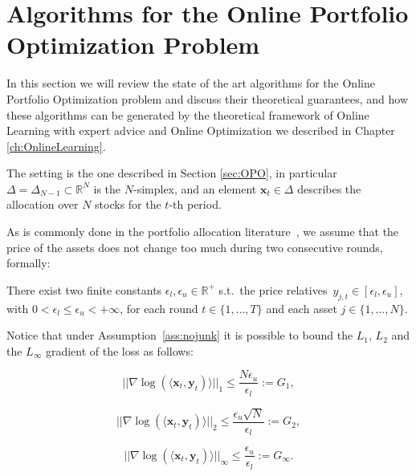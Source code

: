 \chapter{Algorithms for the Online Portfolio Optimization Problem}\label{ch:algos}

In this section we will review the state of the art algorithms for the Online Portfolio Optimization problem and discuss their theoretical guarantees, and how these algorithms can be generated by the theoretical framework of Online Learning with expert advice and Online Optimization we described in Chapter \ref{ch:OnlineLearning}.

The setting is the one described in Section \ref{sec:OPO}, in particular $\Delta=\Delta_{N-1}\subset \mathbb R^N$ is the $N$-simplex, and an element $\mathbf x_t\in\Delta$ describes the allocation over $N$ stocks for the $t$-th period.

As is commonly done in the portfolio allocation literature~\cite{agarwal2006algorithms}, we assume that the price of the assets does not change too much during two consecutive rounds, formally:

\begin{assumption} \label{ass:nojunk}
     There exist two finite constants $\epsilon_l, \epsilon_u \in \mathbb{R}^+$ s.t.~the price relatives~$y_{j,t} \in [\epsilon_l, \epsilon_u]$, with $0 < \epsilon_l \leq \epsilon_u < +\infty$, for each round $t \in \{ 1, \ldots, T \}$ and each asset $j \in \{1, \ldots, N \}$.
\end{assumption}

Notice that under Assumption~\ref{ass:nojunk} it is possible to bound the $L_1$, $L_2$ and the $L_\infty$ gradient of the loss as follows:

\begin{equation} \label{eq:bounded_gradient_1}
    ||\nabla \log (\langle \mathbf{x}_t, \mathbf{y}_t) \rangle||_1 \leq \frac{N\epsilon_u}{\epsilon_l}:=G_1,
\end{equation}

\begin{equation} \label{eq:bounded_gradient_2}
    ||\nabla \log (\langle \mathbf{x}_t, \mathbf{y}_t) \rangle||_2 \leq \frac{\epsilon_u \sqrt{N}}{\epsilon_l}:=G_2,
\end{equation}

\begin{equation} \label{eq:bounded_gradient_3}
    ||\nabla \log (\langle \mathbf{x}_t, \mathbf{y}_t) \rangle||_\infty \leq \frac{\epsilon_u }{\epsilon_l}:=G_\infty.
\end{equation}

